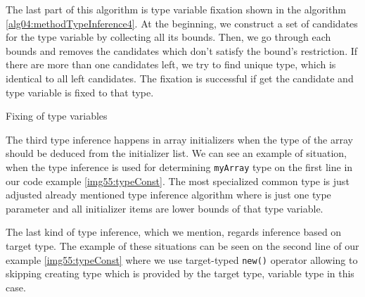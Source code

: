 \par
{}
The last part of this algorithm is type variable fixation shown in the algorithm \ref{alg04:methodTypeInference4}.
At the beginning, we construct a set of candidates for the type variable by collecting all its bounds.
Then, we go through each bounds and removes the candidates which don't satisfy the bound's restriction.
If there are more than one candidates left, we try to find unique type, which is identical to all left candidates.
The fixation is successful if get the candidate and type variable is fixed to that type.
\par
\begin{algorithm}

\caption{Fixing of type variables}
\label{alg04:methodTypeInference4}
\end{algorithm}
The third type inference happens in array initializers when the type of the array should be deduced from the initializer list.
We can see an example of situation, when the type inference is used for determining \texttt{myArray} type on the first line in our code example \ref{img55:typeConst}.
The most specialized common type is just adjusted already mentioned type inference algorithm where is just one type parameter and all initializer items are lower bounds of that type variable.
\par
{}
The last kind of type inference, which we mention, regards inference based on target type.
The example of these situations can be seen on the second line of our example \ref{img55:typeConst} where we use target-typed \texttt{new()} operator allowing to skipping creating type which is provided by the target type, variable type in this case.

